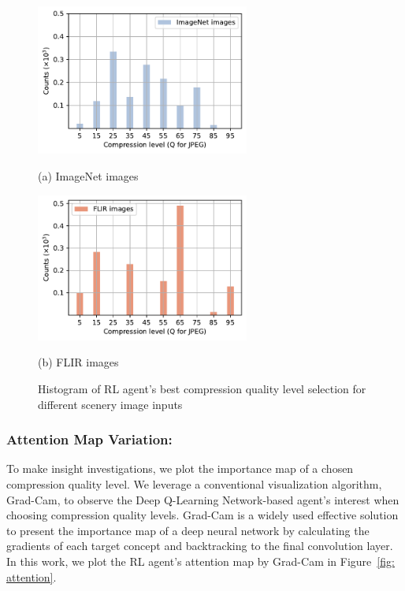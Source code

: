 \begin{figure}[!t]
{\color{revise}
	\begin{minipage}[t]{0.48\linewidth}
		\centerline{\includegraphics[width=7cm]{figures/ImageNet_Baidu_choices.pdf}}
		\centerline{(a) ImageNet images}
	\end{minipage}
	\hfill
	\begin{minipage}[t]{0.48\linewidth}
		\centerline{\includegraphics[width=7cm]{figures/FLIR_Baidu_choices.pdf}}
		\centerline{(b) FLIR images}
	\end{minipage}	
    \caption{\textcolor{revise}{Histogram of RL agent's best compression quality level selection for different scenery image inputs}}
	\label{fig: dataset_change}
}
\vspace{-0.1cm} 
\end{figure}

\subsubsection{Attention Map Variation:}
\label{subsec: attention map}

To make insight investigations, we plot the importance map of a chosen compression quality level. We leverage a conventional visualization algorithm, Grad-Cam, to observe the Deep Q-Learning Network-based agent's interest when choosing compression quality levels. Grad-Cam is a widely used effective solution to present the importance map of a deep neural network by calculating the gradients of each target concept and backtracking to the final convolution layer. In this work, we plot the RL agent's attention map by Grad-Cam in Figure~\ref{fig: attention}. %

